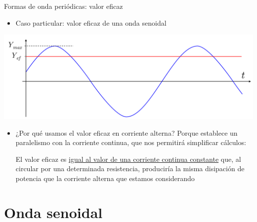 \documentclass[aspectratio=169, usenames,svgnames,dvipsnames]{beamer}
\begin{document}

\begin{frame}{Formas de onda periódicas: \hspace{3mm}valor eficaz}

    \vspace{1mm}
    \begin{itemize}
		\item Caso particular: valor eficaz de una \alert{onda senoidal}
    \end{itemize}

    \vspace{-1mm}
    \begin{center}
        \includegraphics[width=.74\linewidth]{../figs/Senoidal_valorEficaz.pdf}
    \end{center}  

    \vspace{-2mm}
    \begin{itemize}
		\item ¿Por qué usamos el valor eficaz en corriente alterna? Porque establece un \alert{paralelismo con la corriente continua}, que nos permitirá simplificar cálculos:

        \vspace{3mm}
        El valor eficaz es \underline{igual al valor de una corriente continua constante} que, al circular por una determinada resistencia, \alert{produciría la misma disipación de potencia} que la corriente alterna que estamos considerando
    \end{itemize}

\end{frame}


\section{Onda senoidal}
\end{document}
